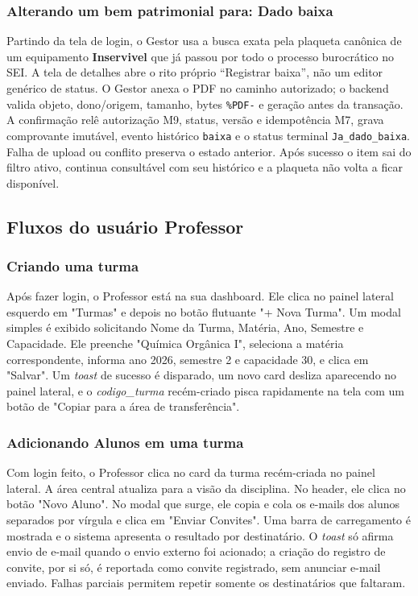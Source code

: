 \subsubsection{Alterando um bem patrimonial para: Dado baixa}
Partindo da tela de login, o Gestor usa a busca exata pela plaqueta canônica de um equipamento \textbf{Inservivel} que já passou por todo o processo burocrático no SEI. A tela de detalhes abre o rito próprio ``Registrar baixa'', não um editor genérico de status. O Gestor anexa o PDF no caminho autorizado; o backend valida objeto, dono/origem, tamanho, bytes \texttt{\%PDF-} e geração antes da transação. A confirmação relê autorização M9, status, versão e idempotência M7, grava comprovante imutável, evento histórico \texttt{baixa} e o status terminal \texttt{Ja\_dado\_baixa}. Falha de upload ou conflito preserva o estado anterior. Após sucesso o item sai do filtro ativo, continua consultável com seu histórico e a plaqueta não volta a ficar disponível.

\subsection{Fluxos do usuário Professor}

\subsubsection{Criando uma turma}
Após fazer login, o Professor está na sua dashboard. Ele clica no painel lateral esquerdo em "Turmas" e depois no botão flutuante "+ Nova Turma". Um modal simples é exibido solicitando Nome da Turma, Matéria, Ano, Semestre e Capacidade. Ele preenche "Química Orgânica I", seleciona a matéria correspondente, informa ano 2026, semestre 2 e capacidade 30, e clica em "Salvar". Um \textit{toast} de sucesso é disparado, um novo card desliza aparecendo no painel lateral, e o \textit{codigo\_turma} recém-criado pisca rapidamente na tela com um botão de "Copiar para a área de transferência".

\subsubsection{Adicionando Alunos em uma turma}
Com login feito, o Professor clica no card da turma recém-criada no painel lateral. A área central atualiza para a visão da disciplina. No header, ele clica no botão "Novo Aluno". No modal que surge, ele copia e cola os e-mails dos alunos separados por vírgula e clica em "Enviar Convites". Uma barra de carregamento é mostrada e o sistema apresenta o resultado por destinatário. O \textit{toast} só afirma envio de e-mail quando o envio externo foi acionado; a criação do registro de convite, por si só, é reportada como convite registrado, sem anunciar e-mail enviado. Falhas parciais permitem repetir somente os destinatários que faltaram.

